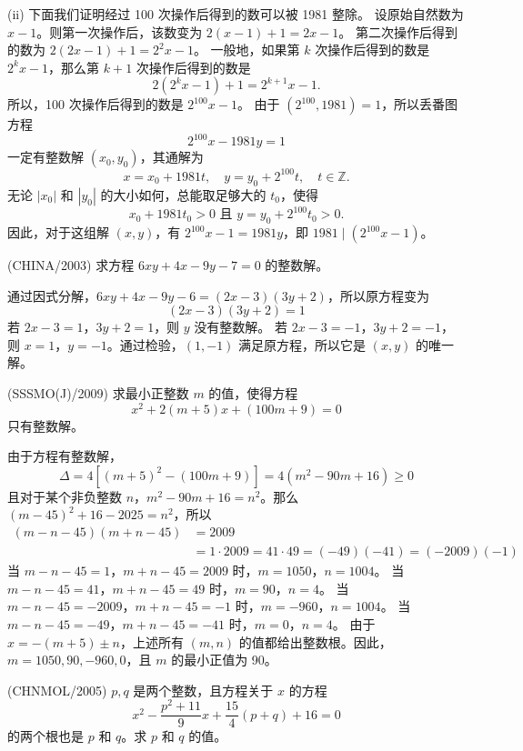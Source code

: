 \begin{questions}
\begin{solution}
(ii) 下面我们证明经过 100 次操作后得到的数可以被 1981 整除。
设原始自然数为 $x - 1$。则第一次操作后，该数变为 $2(x - 1) + 1 = 2x - 1$。
第二次操作后得到的数为 $2(2x - 1) + 1 = 2^2x - 1$。
一般地，如果第 $k$ 次操作后得到的数是 $2^kx - 1$，那么第 $k+1$ 次操作后得到的数是
\[
2(2^kx - 1) + 1 = 2^{k+1}x - 1.
\]
所以，100 次操作后得到的数是 $2^{100}x - 1$。
由于 $(2^{100}, 1981) = 1$，所以丢番图方程
\[
2^{100}x - 1981y = 1
\]
一定有整数解 $(x_0, y_0)$，其通解为
\[
x = x_0 + 1981t, \quad y = y_0 + 2^{100}t, \quad t \in \mathbb{Z}.
\]
无论 $|x_0|$ 和 $|y_0|$ 的大小如何，总能取足够大的 $t_0$，使得
\[
x_0 + 1981t_0 > 0 \text{ 且 } y = y_0 + 2^{100}t_0 > 0.
\]
因此，对于这组解 $(x, y)$，有 $2^{100}x - 1 = 1981y$，即 $1981 \mid (2^{100}x - 1)$。
\end{solution}

\question (CHINA/2003) 求方程 $6xy+4x-9y-7=0$ 的整数解。

\begin{solution}
通过因式分解，$6xy+4x-9y-6=(2x-3)(3y+2)$，所以原方程变为
\[
(2x-3)(3y+2)=1
\]
若 $2x-3=1$，$3y+2=1$，则 $y$ 没有整数解。
若 $2x-3=-1$，$3y+2=-1$，则 $x=1$，$y=-1$。通过检验，$(1,-1)$ 满足原方程，所以它是 $(x,y)$ 的唯一解。
\end{solution}

\question (SSSMO(J)/2009) 求最小正整数 $m$ 的值，使得方程
\[
x^2+2(m+5)x+(100m+9)=0
\]
只有整数解。

\begin{solution}
由于方程有整数解，
\[
\Delta = 4[(m+5)^2-(100m+9)] = 4(m^2-90m+16) \ge 0
\]
且对于某个非负整数 $n$，$m^2-90m+16=n^2$。那么 $(m-45)^2+16-2025=n^2$，所以
\begin{align*}
(m-n-45)(m+n-45) &= 2009 \\
&= 1 \cdot 2009 = 41 \cdot 49 = (-49)(-41) = (-2009)(-1)
\end{align*}
当 $m-n-45=1$，$m+n-45=2009$ 时，$m=1050$，$n=1004$。
当 $m-n-45=41$，$m+n-45=49$ 时，$m=90$，$n=4$。
当 $m-n-45=-2009$，$m+n-45=-1$ 时，$m=-960$，$n=1004$。
当 $m-n-45=-49$，$m+n-45=-41$ 时，$m=0$，$n=4$。
由于 $x=-(m+5) \pm n$，上述所有 $(m,n)$ 的值都给出整数根。因此，$m=1050, 90, -960, 0$，且 $m$ 的最小正值为 90。
\end{solution}

\question (CHNMOL/2005) $p, q$ 是两个整数，且方程关于 $x$ 的方程
\[
x^2-\frac{p^2+11}{9}x+\frac{15}{4}(p+q)+16=0
\]
的两个根也是 $p$ 和 $q$。求 $p$ 和 $q$ 的值。


\end{questions}
